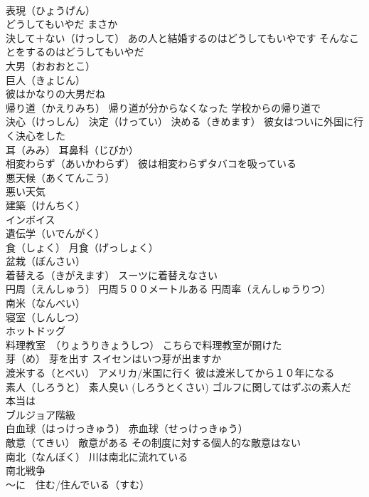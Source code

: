 \documentclass[8pt]{extreport}
\begin{document}
\begin{CJK}{UTF8}{min}
\\	表現（ひょうげん）
\\	どうしてもいやだ まさか 
\\	決して＋ない（けっして） あの人と結婚するのはどうしてもいやです そんなことをするのはどうしてもいやだ
\\	大男（おおおとこ）
\\	巨人（きょじん） 
\\	彼はかなりの大男だね
\\	帰り道（かえりみち） 帰り道が分からなくなった 学校からの帰り道で
\\	決心（けっしん） 決定（けってい） 決める（きめます） 彼女はついに外国に行く決心をした
\\	耳（みみ） 耳鼻科（じびか）
\\	相変わらず（あいかわらず） 彼は相変わらずタバコを吸っている
\\	悪天候（あくてんこう）
\\	悪い天気
\\	建築（けんちく）
\\	インボイス
\\	遺伝学（いでんがく）
\\	食（しょく） 月食（げっしょく）
\\	盆栽（ぼんさい）
\\	着替える（きがえます） スーツに着替えなさい
\\	円周（えんしゅう） 円周５００メートルある 円周率（えんしゅうりつ）
\\	南米（なんべい）
\\	寝室（しんしつ）
\\	ホットドッグ
\\	料理教室　（りょうりきょうしつ） こちらで料理教室が開けた
\\	芽（め） 芽を出す スイセンはいつ芽が出ますか
\\	渡米する（とべい） アメリカ/米国に行く 彼は渡米してから１０年になる
\\	素人（しろうと） 素人臭い (しろうとくさい) ゴルフに関してはずぶの素人だ
\\	本当は
\\	ブルジョア階級
\\	白血球（はっけっきゅう） 赤血球（せっけっきゅう）
\\	敵意（てきい） 敵意がある その制度に対する個人的な敵意はない
\\	南北（なんぼく） 川は南北に流れている 
\\	南北戦争
\\	～に　住む/住んでいる（すむ）

\end{CJK}
\end{document}
